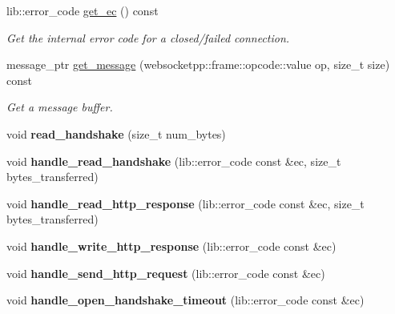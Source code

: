 \begin{DoxyCompactItemize}
lib\+::error\+\_\+code \mbox{\hyperlink{classwebsocketpp_1_1connection_a8c05c88d471342673abf0e5ce60aa4cc}{get\+\_\+ec}} () const
\begin{DoxyCompactList}\small\item\em Get the internal error code for a closed/failed connection. \end{DoxyCompactList}\item 
message\+\_\+ptr \mbox{\hyperlink{classwebsocketpp_1_1connection_a854cb45d1c96d0a2e19ad0ba827a0f9e}{get\+\_\+message}} (websocketpp\+::frame\+::opcode\+::value op, size\+\_\+t size) const
\begin{DoxyCompactList}\small\item\em Get a message buffer. \end{DoxyCompactList}\item 
\mbox{\label{classwebsocketpp_1_1connection_a9e19e781b4abda3e4a39f4f25077a29c}} 
void {\bfseries read\+\_\+handshake} (size\+\_\+t num\+\_\+bytes)
\item 
\mbox{\label{classwebsocketpp_1_1connection_a9c7e83aae3418cdf71e6fcf1dce3a255}} 
void {\bfseries handle\+\_\+read\+\_\+handshake} (lib\+::error\+\_\+code const \&ec, size\+\_\+t bytes\+\_\+transferred)
\item 
\mbox{\label{classwebsocketpp_1_1connection_a261ca392f8b31cd0f5a1b2ccc11c3037}} 
void {\bfseries handle\+\_\+read\+\_\+http\+\_\+response} (lib\+::error\+\_\+code const \&ec, size\+\_\+t bytes\+\_\+transferred)
\item 
\mbox{\label{classwebsocketpp_1_1connection_a6f2451a76c49b4c2a88de4efd4f8bda6}} 
void {\bfseries handle\+\_\+write\+\_\+http\+\_\+response} (lib\+::error\+\_\+code const \&ec)
\item 
\mbox{\label{classwebsocketpp_1_1connection_af37addaf4d89de32d3d8f4da668313c5}} 
void {\bfseries handle\+\_\+send\+\_\+http\+\_\+request} (lib\+::error\+\_\+code const \&ec)
\item 
\mbox{\label{classwebsocketpp_1_1connection_aee1b6e47985b434303b8d6e5f27177a3}} 
void {\bfseries handle\+\_\+open\+\_\+handshake\+\_\+timeout} (lib\+::error\+\_\+code const \&ec)

\end{DoxyCompactItemize}
